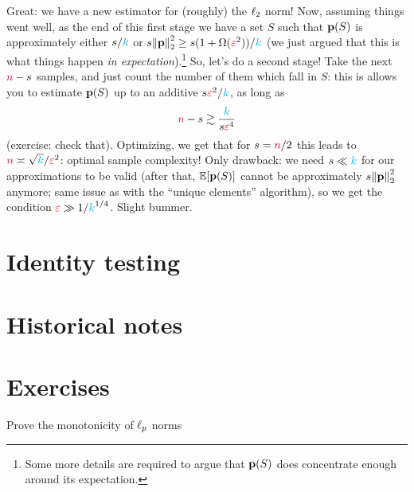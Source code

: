 Great: we have a new estimator for (roughly) the $\lp[2]$ norm! Now, assuming things went well, as the end of this first stage we have a set $S$ such that $\p(S)$ is approximately either $s/\ab$ or $s\normtwo{\p}^2\geq s(1+\Omega(\dst^2))/\ab$ (we just argued that this is what things happen \emph{in expectation}).\footnote{Some more details are required to argue that $\p(S)$ does concentrate enough around its expectation.} So, let's do a second stage! Take the next $\ns-s$ samples, and just count the number of them which fall in $S$: this is allows you to estimate $\p(S)$  up to an additive $s\dst^2/\ab$, as long as
\[
      \ns - s \gtrsim \frac{\ab}{s\dst^4}
\]
(exercise: check that). Optimizing, we get that for $s=\ns/2$ this leads to $\ns \asymp \sqrt{\ab}/\dst^2$: optimal sample complexity! Only drawback: we need $s\ll \ab$ for our approximations to be valid (after that, $\expect{\p(S)}$ cannot be approximately $s\normtwo{\p}^2$ anymore; same issue as with the ``unique elements'' algorithm), so we get the condition $\dst \gg 1/\ab^{1/4}$. Slight bummer.

\section{Identity testing}

\section{Historical notes}
\cite{Ingster??}
\cite{GoldreichR00}
\cite{Batu++}
\cite{Paninski08}
\cite{ChanDVV14}
\cite{AcharyaDK15}
\cite{DiakonikolasGPP18}
\cite{BlaisCG17}
\cite{HuangM13}

\section{Exercises}
Prove the monotonicity of $\lp[p]$ norms


